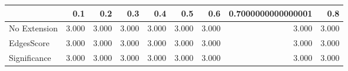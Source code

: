 \begin{tabular}{lrrrrrrrr}
\toprule
{} &   0.1 &   0.2 &   0.3 &   0.4 &   0.5 &   0.6 & 0.7000000000000001 &   0.8 \\
\midrule
No Extension & 3.000 & 3.000 & 3.000 & 3.000 & 3.000 & 3.000 &              3.000 & 3.000 \\
EdgesScore   & 3.000 & 3.000 & 3.000 & 3.000 & 3.000 & 3.000 &              3.000 & 3.000 \\
Significance & 3.000 & 3.000 & 3.000 & 3.000 & 3.000 & 3.000 &              3.000 & 3.000 \\
\bottomrule
\end{tabular}

